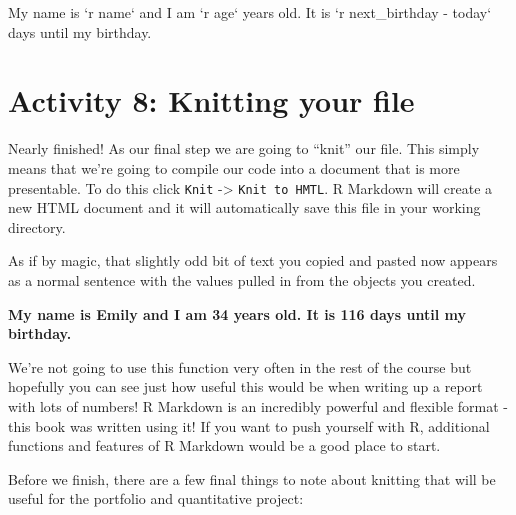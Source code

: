 \documentclass[]{book}
\newenvironment{Shaded}{\begin{snugshade}}{\end{snugshade}}
\newcommand{\DataTypeTok}[1]{\textcolor[rgb]{0.13,0.29,0.53}{#1}}
\newcommand{\NormalTok}[1]{#1}
\newcommand{\StringTok}[1]{\textcolor[rgb]{0.31,0.60,0.02}{#1}}
\begin{document}
\begin{Shaded}
\begin{Highlighting}[]
\NormalTok{My name is }\StringTok{`}\DataTypeTok{r name}\StringTok{`}\NormalTok{ and I am }\StringTok{`}\DataTypeTok{r age}\StringTok{`}\NormalTok{ years old. It is }\StringTok{`}\DataTypeTok{r next_birthday - today}\StringTok{`}\NormalTok{ days until my birthday.}
\end{Highlighting}
\end{Shaded}

\hypertarget{activity-8-knitting-your-file}{%
\section{Activity 8: Knitting your file}\label{activity-8-knitting-your-file}}

Nearly finished! As our final step we are going to ``knit'' our file. This simply means that we're going to compile our code into a document that is more presentable. To do this click \texttt{Knit} -\textgreater{} \texttt{Knit\ to\ HMTL}. R Markdown will create a new HTML document and it will automatically save this file in your working directory.

As if by magic, that slightly odd bit of text you copied and pasted now appears as a normal sentence with the values pulled in from the objects you created.

\textbf{My name is Emily and I am 34 years old. It is 116 days until my birthday.}

We're not going to use this function very often in the rest of the course but hopefully you can see just how useful this would be when writing up a report with lots of numbers! R Markdown is an incredibly powerful and flexible format - this book was written using it! If you want to push yourself with R, additional functions and features of R Markdown would be a good place to start.

Before we finish, there are a few final things to note about knitting that will be useful for the portfolio and quantitative project:
\end{document}
